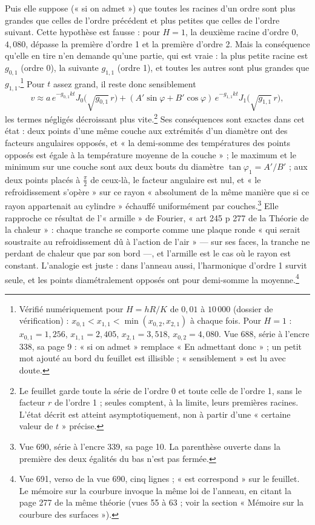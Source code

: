 \documentclass[11pt,a4paper]{article}
\begin{document}
Puis elle suppose (« si on admet ») que toutes les racines d'un ordre sont
plus grandes que celles de l'ordre précédent et plus petites que celles de
l'ordre suivant. Cette hypothèse est fausse : pour $H = 1$, la deuxième racine
d'ordre 0, $4{,}080$, dépasse la première d'ordre 1 et la première d'ordre 2.
Mais la conséquence qu'elle en tire n'en demande qu'une partie, qui est vraie :
la plus petite racine est $g_{0,1}$ (ordre 0), la suivante $g_{1,1}$ (ordre 1),
et toutes les autres sont plus grandes que $g_{1,1}$.\footnote{Vérifié
numériquement pour $H = hR/K$ de $0{,}01$ à $10\,000$ (dossier de
vérification) : $x_{0,1} < x_{1,1} < \min(x_{0,2}, x_{2,1})$ à chaque fois.
Pour $H = 1$ : $x_{0,1} = 1{,}256$, $x_{1,1} = 2{,}405$, $x_{2,1} = 3{,}518$,
$x_{0,2} = 4{,}080$. Vue 688, série à l'encre 338, sa page 9 : « si on admet »
remplace « En admettant donc » ; un petit mot ajouté au bord du feuillet est
illisible ; « sensiblement » est lu avec doute.} Pour $t$ assez grand, il reste
donc sensiblement
\[
v \approx a\,e^{-g_{0,1}kt}J_0\big(\sqrt{g_{0,1}}\,r\big) + (A'\sin\varphi +
B'\cos\varphi)\,e^{-g_{1,1}kt}J_1\big(\sqrt{g_{1,1}}\,r\big),
\]
les termes négligés décroissant plus vite.\footnote{Le feuillet garde toute la
série de l'ordre 0 et toute celle de l'ordre 1, sans le facteur $r$ de l'ordre
1 ; seules comptent, à la limite, leurs premières racines. L'état décrit est
atteint asymptotiquement, non à partir d'une « certaine valeur de $t$ »
précise.} Ses conséquences sont exactes dans cet état : deux points d'une même
couche aux extrémités d'un diamètre ont des facteurs angulaires opposés, et
« la demi-somme des températures des points opposés est égale à la
température moyenne de la couche » ; le maximum et le minimum sur une couche
sont aux deux bouts du diamètre $\tan\varphi_1 = A'/B'$ ; aux deux points
placés à $\frac\pi2$ de ceux-là, le facteur angulaire est nul, et « le
refroidissement s'opère » sur ce rayon « absolument de la même manière que si
ce rayon appartenait au cylindre » échauffé uniformément par
couches.\footnote{Vue 690, série à l'encre 339, sa page 10. La parenthèse
ouverte dans la première des deux égalités du bas n'est pas fermée.} Elle
rapproche ce résultat de l'« armille » de Fourier, « art 245 p 277 de la
Théorie de la chaleur » : chaque tranche se comporte comme une plaque ronde « qui
serait soustraite au refroidissement dû à l'action de l'air » — sur ses faces,
la tranche ne perdant de chaleur que par son bord —, et l'armille est le cas
où le rayon est constant. L'analogie est juste : dans l'anneau aussi,
l'harmonique d'ordre 1 survit seule, et les points diamétralement opposés ont
pour demi-somme la moyenne.\footnote{Vue 691, verso de la vue 690, cinq lignes ;
« est correspond » sur le feuillet. Le mémoire sur la courbure invoque la même
loi de l'anneau, en citant la page 277 de la même théorie (vues 55 à 63 ; voir
la section « Mémoire sur la courbure des surfaces »).}
\end{document}
